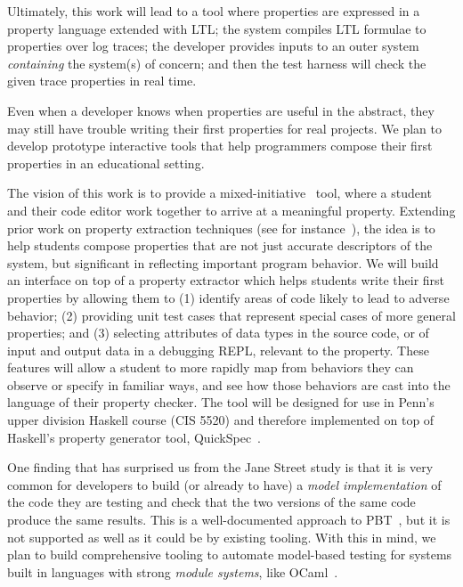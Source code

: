 Ultimately, this work will lead to a tool where properties are expressed in a
property language extended with LTL; the system compiles LTL formulae to
properties over log traces; the developer provides inputs to an outer system
\emph{containing} the system(s) of concern; and then the test harness will check
the given trace properties in real time.


%
Even when a developer knows when properties are useful in the abstract,
they may still have trouble writing their first properties
for real projects. We plan to develop prototype interactive tools that help
programmers compose their first properties in an educational setting.

The vision of this work is to provide a mixed-initiative~\cite{ref:allen1999mixed}
tool, where a student and their code editor work together to arrive at a
meaningful property. Extending prior work on property extraction techniques (see for
instance~\cite{ref:ammons2002mining, ref:le2018deep, ref:claessen2010quickspec,
smith_discovering_2017}), the idea is to help students compose properties that
are not just accurate descriptors of the system, but significant in reflecting
important program behavior. We will build an interface on top of a property
extractor which helps students write their first properties by allowing them
to (1) identify areas of code likely to lead to adverse behavior;
(2) providing unit test cases that represent special cases of more general
properties; and (3) selecting attributes of data types in the source code, or
of input and output data in a debugging REPL, relevant to the property. These
features will allow a student to more rapidly map from behaviors they can
observe or specify in familiar ways, and see how those behaviors are cast into
the language of their property checker.
%
The tool will be designed for use in Penn's upper division Haskell
course (CIS 5520) and therefore implemented on top of
Haskell's property
generator tool, QuickSpec~\cite{ref:claessen2010quickspec}.


One finding that has surprised us from the Jane Street study is that
it is {very} common for developers to build (or already to have) a
{\em model
implementation} of the code they are testing and check that the two versions of
the same code produce the same results.  This is a well-documented approach to
PBT~\cite{hughes_experiences_2016}, but it is not supported as well as it could
be by existing tooling.
%
With this in mind, we plan to build comprehensive tooling to automate
model-based testing for systems built in languages with strong {\em
  module systems}, like OCaml~\cite{macqueen_modules_1984}.

